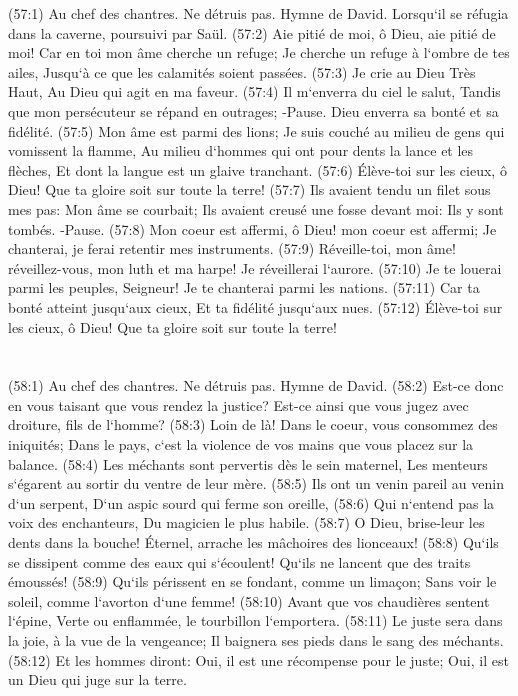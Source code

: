 \verse (57:1) Au chef des chantres. Ne détruis pas. Hymne de David. Lorsqu`il se réfugia dans la caverne, poursuivi par Saül. (57:2) Aie pitié de moi, ô Dieu, aie pitié de moi! Car en toi mon âme cherche un refuge; Je cherche un refuge à l`ombre de tes ailes, Jusqu`à ce que les calamités soient passées. 
\verse (57:3) Je crie au Dieu Très Haut, Au Dieu qui agit en ma faveur. 
\verse (57:4) Il m`enverra du ciel le salut, Tandis que mon persécuteur se répand en outrages; -Pause. Dieu enverra sa bonté et sa fidélité. 
\verse (57:5) Mon âme est parmi des lions; Je suis couché au milieu de gens qui vomissent la flamme, Au milieu d`hommes qui ont pour dents la lance et les flèches, Et dont la langue est un glaive tranchant. 
\verse (57:6) Élève-toi sur les cieux, ô Dieu! Que ta gloire soit sur toute la terre! 
\verse (57:7) Ils avaient tendu un filet sous mes pas: Mon âme se courbait; Ils avaient creusé une fosse devant moi: Ils y sont tombés. -Pause. 
\verse (57:8) Mon coeur est affermi, ô Dieu! mon coeur est affermi; Je chanterai, je ferai retentir mes instruments. 
\verse (57:9) Réveille-toi, mon âme! réveillez-vous, mon luth et ma harpe! Je réveillerai l`aurore. 
\verse (57:10) Je te louerai parmi les peuples, Seigneur! Je te chanterai parmi les nations. 
\verse (57:11) Car ta bonté atteint jusqu`aux cieux, Et ta fidélité jusqu`aux nues. 
\verse (57:12) Élève-toi sur les cieux, ô Dieu! Que ta gloire soit sur toute la terre! 

\chapter{}

\verse (58:1) Au chef des chantres. Ne détruis pas. Hymne de David. (58:2) Est-ce donc en vous taisant que vous rendez la justice? Est-ce ainsi que vous jugez avec droiture, fils de l`homme? 
\verse (58:3) Loin de là! Dans le coeur, vous consommez des iniquités; Dans le pays, c`est la violence de vos mains que vous placez sur la balance. 
\verse (58:4) Les méchants sont pervertis dès le sein maternel, Les menteurs s`égarent au sortir du ventre de leur mère. 
\verse (58:5) Ils ont un venin pareil au venin d`un serpent, D`un aspic sourd qui ferme son oreille, 
\verse (58:6) Qui n`entend pas la voix des enchanteurs, Du magicien le plus habile. 
\verse (58:7) O Dieu, brise-leur les dents dans la bouche! Éternel, arrache les mâchoires des lionceaux! 
\verse (58:8) Qu`ils se dissipent comme des eaux qui s`écoulent! Qu`ils ne lancent que des traits émoussés! 
\verse (58:9) Qu`ils périssent en se fondant, comme un limaçon; Sans voir le soleil, comme l`avorton d`une femme! 
\verse (58:10) Avant que vos chaudières sentent l`épine, Verte ou enflammée, le tourbillon l`emportera. 
\verse (58:11) Le juste sera dans la joie, à la vue de la vengeance; Il baignera ses pieds dans le sang des méchants. 
\verse (58:12) Et les hommes diront: Oui, il est une récompense pour le juste; Oui, il est un Dieu qui juge sur la terre. 

